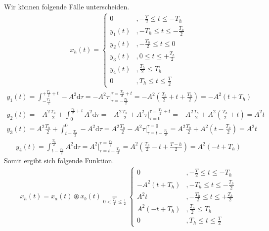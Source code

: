 \documentclass[11pt,a4paper,DIV=12]{scrartcl}
\newcommand{\diff}{\mathrm{d}}
\begin{document}
Wir können folgende Fälle unterscheiden.
\begin{gather}
	x_{h}(t)=
		\begin{cases}
			0 &, -\frac{T}{2}\leq t \leq -T_h \\
			y_1(t) &,-T_h\leq t \leq -\frac{T_h}{2} \\
			y_2(t) &, -\frac{T_h}{2} \leq t \leq 0 \\
			y_3(t) &, 0 \leq t \leq +\frac{T_h}{2} \\
			y_4(t) &, \frac{T_h}{2}\leq T_h \\
			0 &, T_h \leq t \leq \frac{T}{2}
		\end{cases}
\end{gather}
%
%
\begin{gather}
	y_1(t)=\int_{-\frac{T_h}{2}}^{+\frac{T_h}{2}+t}-A^2\diff \tau
	= -A^2\tau \Bigg |_{\tau=-\frac{T_h}{2}}^{\tau=\frac{T_h}{2}+t}
	=-A^2(\frac{T_h}{2}+t+\frac{T_h}{2})
	=-A^2(t+T_h)
\end{gather}
%
%
%
\begin{align}
	y_2(t)=-A^2\frac{T_h}{2}+\int_{0}^{\frac{T_h}{2}+t}A^2\diff \tau
	= -A^2\frac{T_h}{2}+A^2\tau\Bigg |_{\tau=0}^{\tau=\frac{T_h}{2}+t}
	=-A^2\frac{T_h}{2}+A^2\left(\frac{T_h}{2}+t\right)
	=A^2t
\end{align}
%
%
\begin{align}
	y_3(t)=A^2\frac{T_h}{2}+\int_{t-\frac{T_h}{2}}^{0}-A^2\diff \tau
	=A^2\frac{T_h}{2}-A^2\tau\Bigg |_{\tau=t-\frac{T_h}{2}}^{\tau=0}
	=A^2\frac{T_h}{2}+A^2\left(t-\frac{T_h}{2}\right)
	=A^2t
\end{align}
%
%
\begin{align}
	y_4(t)=\int_{t-\frac{T_h}{2}}^{\frac{T_h}{2}}A^2\diff \tau
	=A^2\Bigg |_{\tau=t-\frac{T_h}{2}}^{\tau=\frac{T_h}{2}}
	=A^2\left(\frac{T_h}{2}-t+\frac{T-h}{2}\right)
	=A^2(-t+T_h)
\end{align}
%
%
Somit ergibt sich folgende Funktion.
\begin{gather}
	x_{h}(t)=x_{a}(t)\circledast x_{b}(t)
	\underset{0<\frac{T_h}{T}\leq\frac{1}{2}}{=}
		\begin{cases}
			0 &, -\frac{T}{2}\leq t \leq -T_h \\
			-A^2(t+T_h) &,-T_h\leq t \leq -\frac{T_h}{2} \\
			A^2t &, -\frac{T_h}{2} \leq t \leq +\frac{T_h}{2} \\
			A^2(-t+T_h) &, \frac{T_h}{2}\leq T_h \\
			0 &, T_h \leq t \leq \frac{T}{2}
		\end{cases}
\end{gather}
\end{document}
